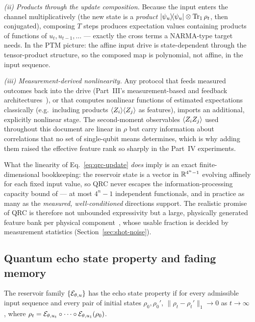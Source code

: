 \emph{(ii) Products through the update composition.} Because the input enters
the channel multiplicatively (the new state is a \emph{product}
$|\psi_u\rangle\!\langle\psi_u| \otimes \operatorname{Tr}_1\rho_t$, then conjugated), composing $T$
steps produces expectation values containing products of functions of
$u_t, u_{t-1}, \dots$ --- exactly the cross terms a NARMA-type target needs.
In the PTM picture: the affine input drive is state-dependent through the
tensor-product structure, so the composed map is polynomial, not affine, in
the input sequence.

\emph{(iii) Measurement-derived nonlinearity.} Any protocol that feeds
measured outcomes back into the drive (Part~III's measurement-based and
feedback architectures~\citep{kobayashi2024feedback,franceschetto2024harnessing}),
or that computes nonlinear functions of estimated expectations classically
(e.g.\ including products $\langle Z_i\rangle\langle Z_j\rangle$ as features), imports an
additional, explicitly nonlinear stage. The second-moment observables
$\langle Z_iZ_j\rangle$ used throughout this document are linear in $\rho$ but carry
information about correlations that no set of single-qubit means determines,
which is why adding them raised the effective feature rank so sharply in the
Part~IV experiments.

What the linearity of Eq.~\eqref{eq:qrc-update} \emph{does} imply is an exact
finite-dimensional bookkeeping: the reservoir state is a vector in
$\mathbb{R}^{4^n-1}$ evolving affinely for each fixed input value, so QRC never
escapes the information-processing capacity bound of
\citet{dambre2012information} --- at most $4^n-1$ independent functionals, and
in practice as many as the \emph{measured, well-conditioned} directions
support. The realistic promise of QRC is therefore not unbounded expressivity
but a large, physically generated feature bank per physical
component~\citep{fujii2017harnessing,mujal2021opportunities}, whose usable
fraction is decided by measurement statistics
(Section~\ref{sec:shot-noise}).

\subsection{Quantum echo state property and fading memory}
\label{sec:quantum-esp}

\begin{definition}
\label{def:qesp}
The reservoir family $\{\mathcal{E}_{\theta,u}\}$ has the echo state property if
for every admissible input sequence and every pair of initial states
$\rho_0, \rho_0'$,
$\lVert \rho_t - \rho_t' \rVert_1 \to 0$ as $t\to\infty$, where
$\rho_t = \mathcal{E}_{\theta,u_t}\circ\cdots\circ\mathcal{E}_{\theta,u_1}(\rho_0)$.
\end{definition}

